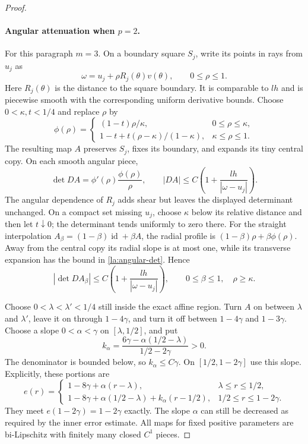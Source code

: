 \documentclass[11pt]{article}
\numberwithin{equation}{section}
\theoremstyle{definition}
\theoremstyle{remark}
\newcommand{\Id}{\operatorname{id}}
\begin{document}
\begin{proof}
\paragraph{Angular attenuation when $p=2$.}
For this paragraph $m=3$.  On a boundary square $S_j$, write its
points in rays from $u_j$ as
\[
 \omega=u_j+\rho R_j(\theta)v(\theta),\qquad 0\le\rho\le1.
\]
Here $R_j(\theta)$ is the distance to the square boundary.  It is
comparable to $lh$ and is piecewise smooth with the corresponding
uniform derivative bounds.  Choose $0<\kappa,t<1/4$ and
replace $\rho$ by
\[
 \phi(\rho)=
 \begin{cases}
  (1-t)\rho/\kappa,&0\le\rho\le\kappa,\\
  1-t+t(\rho-\kappa)/(1-\kappa),&\kappa\le\rho\le1.
 \end{cases}
\]
The resulting map $A$ preserves $S_j$, fixes its boundary, and
expands its tiny central copy.  On each smooth angular piece,
\begin{equation}\label{la:angular-det}
 \det DA=\phi'(\rho)\frac{\phi(\rho)}{\rho},
 \qquad
 |DA|\le C\left(1+\frac{lh}{|\omega-u_j|}\right).
\end{equation}
The angular dependence of $R_j$ adds shear but leaves the displayed
determinant unchanged.  On a compact set missing $u_j$, choose
$\kappa$ below its relative distance and then let $t\downarrow0$;
the determinant tends uniformly to zero there.  For the straight
interpolation $A_\beta=(1-\beta)\Id+\beta A$, the radial profile is
$(1-\beta)\rho+\beta\phi(\rho)$.  Away from the central copy its
radial slope is at most one, while its transverse expansion has the
bound in \eqref{la:angular-det}.  Hence
\begin{equation}\label{la:angular-interpolation}
 |\det DA_\beta|
 \le C\left(1+\frac{lh}{|\omega-u_j|}\right),
 \qquad0\le\beta\le1,\quad\rho\ge\kappa.
\end{equation}

Choose $0<\lambda<\lambda'<1/4$ still inside the exact affine region.
Turn $A$ on between $\lambda$ and $\lambda'$, leave it on through
$1-4\gamma$, and turn it off between $1-4\gamma$ and $1-3\gamma$.
Choose a slope $0<\alpha<\gamma$ on $[\lambda,1/2]$, and put
\[
 k_\alpha=
 \frac{6\gamma-\alpha(1/2-\lambda)}{1/2-2\gamma}>0.
\]
The denominator is bounded below, so $k_\alpha\le C\gamma$.
On $[1/2,1-2\gamma]$ use this slope.  Explicitly, these portions are
\[
 e(r)=
 \begin{cases}
  1-8\gamma+\alpha(r-\lambda),&\lambda\le r\le1/2,\\
  1-8\gamma+\alpha(1/2-\lambda)+k_\alpha(r-1/2),
       &1/2\le r\le1-2\gamma.
 \end{cases}
\]
They meet $e(1-2\gamma)=1-2\gamma$ exactly.  The slope $\alpha$
can still be decreased as required by the inner error estimate.
All maps for fixed positive parameters are bi-Lipschitz with
finitely many closed $C^1$ pieces.


\end{proof}
\end{document}
